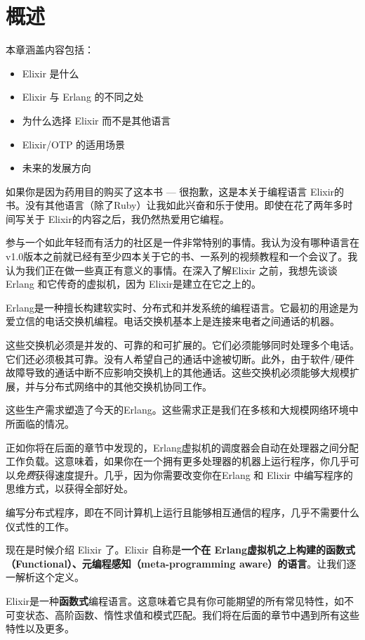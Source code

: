 \chapter{概述}\label{chapt:intro}

本章涵盖内容包括：

\begin{itemize}
\item Elixir 是什么
\item Elixir 与 Erlang 的不同之处
\item 为什么选择 Elixir 而不是其他语言
\item Elixir/OTP 的适用场景
\item 未来的发展方向
\end{itemize}

如果你是因为药用目的购买了这本书 --- 很抱歉，这是本关于编程语言 Elixir的书。没有其他语言（除了Ruby）让我如此兴奋和乐于使用。即使在花了两年多时间写关于 Elixir的内容之后，我仍然热爱用它编程。

参与一个如此年轻而有活力的社区是一件非常特别的事情。我认为没有哪种语言在v1.0版本之前就已经有至少四本关于它的书、一系列的视频教程和一个会议了。我认为我们正在做一些真正有意义的事情。在深入了解Elixir 之前，我想先谈谈 Erlang 和它传奇的虚拟机，因为 Elixir是建立在它之上的。

Erlang是一种擅长构建软实时、分布式和并发系统的编程语言。它最初的用途是为爱立信的电话交换机编程。电话交换机基本上是连接来电者之间通话的机器。

这些交换机必须是并发的、可靠的和可扩展的。它们必须能够同时处理多个电话。它们还必须极其可靠。没有人希望自己的通话中途被切断。此外，由于软件/硬件故障导致的通话中断不应影响交换机上的其他通话。这些交换机必须能够大规模扩展，并与分布式网络中的其他交换机协同工作。

这些生产需求塑造了今天的Erlang。这些需求正是我们在多核和大规模网络环境中所面临的情况。

正如你将在后面的章节中发现的，Erlang虚拟机的调度器会自动在处理器之间分配工作负载。这意味着，如果你在一个拥有更多处理器的机器上运行程序，你几乎可以\emph{免费}获得速度提升。几乎，因为你需要改变你在Erlang 和 Elixir 中编写程序的思维方式，以获得全部好处。

编写分布式程序，即在不同计算机上运行且能够相互通信的程序，几乎不需要什么仪式性的工作。

现在是时候介绍 Elixir 了。Elixir 自称是\textbf{一个在 Erlang虚拟机之上构建的函数式（Functional）、元编程感知（meta-programming aware）的语言}。让我们逐一解析这个定义。

Elixir是一种\textbf{函数式}编程语言。这意味着它具有你可能期望的所有常见特性，如不可变状态、高阶函数、惰性求值和模式匹配。我们将在后面的章节中遇到所有这些特性以及更多。

